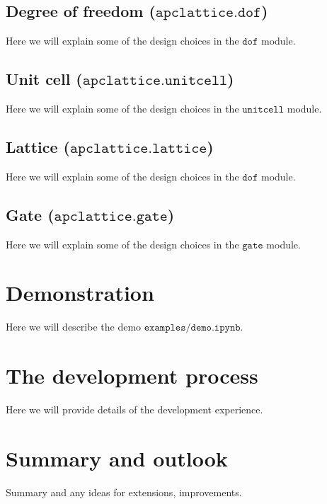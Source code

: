 \documentclass{article}
\begin{document}
\subsection{Degree of freedom ($\texttt{apclattice.dof}$)}
Here we will explain some of the design choices in the $\texttt{dof}$ module.

\subsection{Unit cell ($\texttt{apclattice.unitcell}$)}
Here we will explain some of the design choices in the $\texttt{unitcell}$ module.

\subsection{Lattice ($\texttt{apclattice.lattice}$)}
Here we will explain some of the design choices in the $\texttt{dof}$ module.

\subsection{Gate ($\texttt{apclattice.gate}$)}
Here we will explain some of the design choices in the $\texttt{gate}$ module.

\section{Demonstration}
Here we will describe the demo $\texttt{examples/demo.ipynb}$.

\section{The development process}
Here we will provide details of the development experience.

\section{Summary and outlook}
Summary and any ideas for extensions, improvements.
\end{document}

